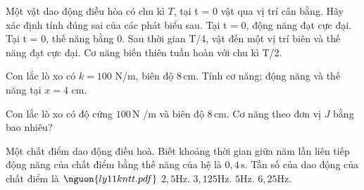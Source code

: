 \begin{ex}
Một vật dao động điều hòa có chu kì $T$, tại t = 0 vật qua vị trí cân bằng. Hãy xác định tính đúng sai của các phát biểu sau.
\choiceTF
{\True Tại t = 0, động năng đạt cực đại.}
{\True Tại t = 0, thế năng bằng 0.}
{\True Sau thời gian T/4, vật đến một vị trí biên và thế năng đạt cực đại.}
{Cơ năng biến thiên tuần hoàn với chu kì T/2.}
\end{ex}

\begin{bt}
Con lắc lò xo có $k=100$ N/m, biên độ $8\,\text{cm}$. Tính cơ năng; động năng và thế năng tại $x=4$ cm.
\end{bt}

\begin{ex}
Con lắc lò xo có độ cứng $100\,\text{N}$ /m và biên độ $8\,\text{cm}$. Cơ năng theo đơn vị $J$ bằng bao nhiêu?
\end{ex}

\begin{ex}
Một chất điểm dao động điều hoà. Biết khoảng thời gian giữa năm lần liên tiếp động năng của chất điểm bằng thế năng của hệ là $0,4\,\mathrm{s}$. Tần số của dao động của chất điểm là $\nguon{ly11 kntt.pdf}$
\choice
{\True $2,5 \mathrm{Hz}$.}
{$3,125 \mathrm{Hz}$.}
{$5 \mathrm{Hz}$.}
{$6,25 \mathrm{Hz}$.}
\end{ex}


